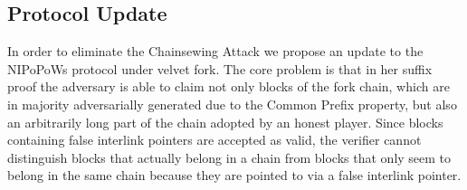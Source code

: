 \documentclass[11pt,a4paper]{article}
\begin{document}
\subsection{Protocol Update}

In order to eliminate the Chainsewing Attack we propose an update to the NIPoPoWs protocol under velvet fork. The core problem is that in her suffix proof the adversary is able to claim not only blocks of the fork chain,  which are in majority adversarially generated due to the Common Prefix property, but also an arbitrarily long part of the chain adopted by an honest player. Since blocks containing false interlink pointers are accepted as valid, the verifier cannot distinguish blocks that actually belong in a chain from blocks that only seem to belong in the same chain because they are pointed to via a false interlink pointer. 
\end{document}
